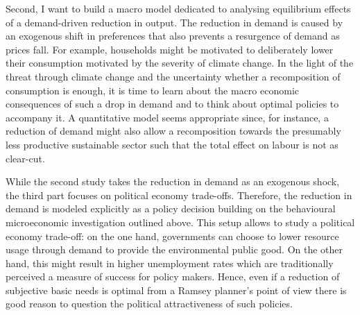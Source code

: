 \documentclass[12pt]{article}
\begin{document}
Second, I want to build a macro model dedicated to analysing equilibrium effects of a demand-driven reduction in output. 
The reduction in demand is caused by an exogenous shift in preferences that also prevents a resurgence of demand as prices fall. For example, households might be motivated to deliberately lower their consumption motivated by the severity of climate change. 
In the light of the threat through climate change and the uncertainty whether a recomposition of consumption is enough, it is time to learn about the macro economic consequences of such a drop in demand and to think about optimal policies to accompany it.
A quantitative model seems appropriate since, for instance, a reduction of demand might also allow a recomposition towards the presumably less productive sustainable sector such that the total effect on labour is not as clear-cut. 

While the second study takes the reduction in demand as an exogenous shock, the third part focuses on political economy trade-offs.
Therefore, the reduction in demand is modeled explicitly as a policy decision building on the behavioural microeconomic investigation outlined above. This setup allows to study a political economy trade-off: on the one hand, governments can choose to lower resource usage through demand to provide the environmental public good. On the other hand, this might result in higher unemployment rates which are traditionally perceived a measure of success for policy makers. Hence, even if a reduction of subjective basic needs is optimal from a Ramsey planner's point of view there is good reason to question the political attractiveness of such policies.
\end{document}
